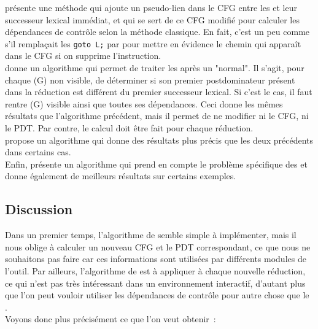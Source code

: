 \cite{Choi94} présente une méthode qui ajoute un pseudo-lien dans le CFG
entre les  et leur successeur lexical immédiat,
et qui se sert de ce CFG modifié pour calculer les dépendances
de contrôle selon la méthode classique.
En fait, c'est un peu comme s'il remplaçait les \verb!goto L;!
par  pour mettre en évidence le chemin
qui apparaît dans le CFG si on supprime l'instruction.\\


\cite{agrawal94slicing} donne un algorithme qui permet de traiter
les  après un \slicing{} "normal".
Il s'agit, pour chaque  (G) non visible,
de déterminer si son premier postdominateur
présent dans la réduction est différent du premier successeur lexical.
Si c'est le cas, il faut rentre (G) visible ainsi que toutes ses dépendances.
Ceci donne les mêmes résultats que l'algorithme précédent,
mais il permet de ne modifier ni le CFG, ni le PDT.
Par contre, le calcul doit être fait pour chaque réduction.\\

\cite{harman98new} propose un algorithme qui donne des résultats
plus précis que les deux précédents dans certains cas.\\

Enfin, \cite{kumar02better} présente un algorithme qui prend
en compte le problème spécifique des  et donne
également de meilleurs résultats sur certains exemples.

\subsection{Discussion}\label{sec-dpdc-goto}

Dans un premier temps, l'algorithme de \cite{Choi94} semble simple à
implémenter, mais il nous oblige à calculer un nouveau CFG et le PDT
correspondant, ce que nous ne souhaitons pas faire car ces informations sont
utilisées par différents modules de l'outil.
Par ailleurs, l'algorithme de \cite{agrawal94slicing}
est à appliquer à chaque nouvelle réduction, ce qui n'est pas très intéressant
dans un environnement interactif, d'autant plus que l'on peut vouloir utiliser
les dépendances de contrôle pour autre chose que le \slicing.\\

Voyons donc plus précisément ce que l'on veut obtenir~:

